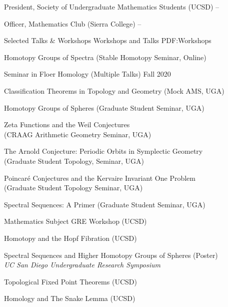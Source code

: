 \documentclass[letterpaper,MMMyyyy,nonstopmode]{simpleresumecv}
\begin{document}
\begin{Body}
\Gap
\Entry
President,
Society of Undergraduate Mathematics Students (UCSD)
\hfill{} --

\Gap
\Entry
Officer, Mathematics Club (Sierra College)
\hfill
{} --

\Section
{Selected Talks \& Workshops}
{Workshops and Talks}
{PDF:Workshops}


\BulletItem
Homotopy Groups of Spectra (Stable Homotopy Seminar, Online)
\hfill {}


\BulletItem
Seminar in Floer Homology (Multiple Talks)
\hfill Fall 2020

\BulletItem
Classification Theorems in Topology and Geometry (Mock AMS, UGA)
\hfill {}

\BulletItem
Homotopy Groups of Spheres (Graduate Student Seminar, UGA)
\hfill {}

\BulletItem
Zeta Functions and the Weil Conjectures \\
(CRAAG Arithmetic Geometry Seminar, UGA)
\hfill {}

\BulletItem
The Arnold Conjecture: Periodic Orbits in Symplectic Geometry \\ (Graduate Student Topology, Seminar, UGA)
\hfill {}

\BulletItem
Poincaré Conjectures and the Kervaire Invariant One Problem \\(Graduate Student Topology Seminar, UGA)
\hfill {}

\BulletItem
Spectral Sequences: A Primer (Graduate Student Seminar, UGA)
\hfill {}

\BulletItem
Mathematics Subject GRE Workshop (UCSD)
\hfill {}

\BulletItem
Homotopy and the Hopf Fibration (UCSD)
\hfill {}

\BulletItem
Spectral Sequences and Higher Homotopy Groups of Spheres (Poster) \\
\textit{UC San Diego Undergraduate Research Symposium}
\hfill {}

\BulletItem
Topological Fixed Point Theorems (UCSD)
\hfill {}

\BigGap

\BulletItem
Homology and The Snake Lemma (UCSD)
\hfill {}


\end{Body}
\end{document}
